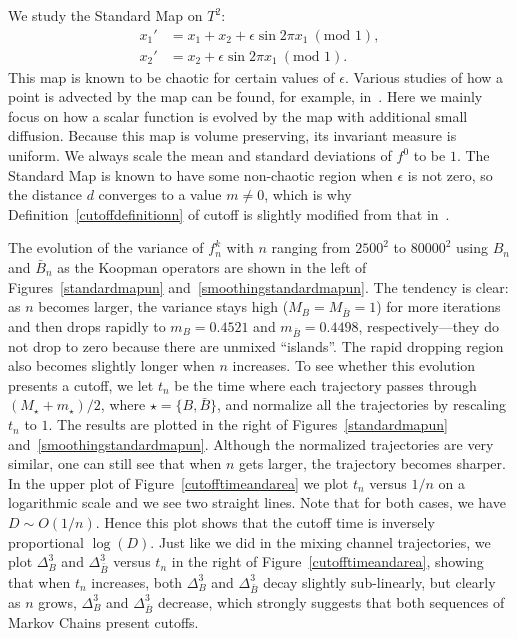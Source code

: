 \documentclass[twocolumn,10pt]{asme2e}
\begin{document}
We study the Standard Map on $T^2$:
   \begin{align}
   \label{Standardmap}
               x_1' &= x_1+x_2 +\epsilon \sin{2 \pi x_1}  \ (\mbox{mod } 1), \nonumber\\
               x_2' &=  x_2 +\epsilon \sin{2 \pi x_1}     \ (\mbox{mod } 1).
   \end{align}
This map is known to be chaotic for certain values of
$\epsilon$. Various studies of how a point is advected by the map can
be found, for example, in~\cite{Ott2002}. Here we mainly focus on how
a scalar function is evolved by the map with additional small
diffusion. Because this map is volume preserving, its invariant
measure is uniform. We always scale the mean and standard deviations
of $f^0$ to be $1$. The Standard Map is known to have some non-chaotic
region when $\epsilon$ is not zero, so the distance $d$ converges to a
value $m \neq 0$, which is why Definition~\ref{cutoffdefinitionn} of
cutoff is slightly modified from that in~\cite{Diaconis2005}.

The evolution of the variance of $f^k_n$ with $n$ ranging from
$2500^2$ to $80000^2$ using $B_n$ and $\bar{B}_n$ as the Koopman
operators are shown in the left of Figures~\ref{standardmapun}
and~\ref{smoothingstandardmapun}. The tendency is clear: as $n$
becomes larger, the variance stays high ($M_B=M_{\bar{B}}=1$) for more
iterations and then drops rapidly to $m_{B} = 0.4521$ and
$m_{\bar{B}}=0.4498$, respectively---they do not drop to zero because
there are unmixed ``islands''. The rapid dropping region also becomes
slightly longer when $n$ increases. To see whether this evolution
presents a cutoff, we let $t_n$ be the time where each trajectory
passes through $(M_{\star}+m_{\star})/2$, where $\star=\{B,\bar{B}\}$,
and normalize all the trajectories by rescaling $t_n$ to $1$. The
results are plotted in the right of Figures~\ref{standardmapun}
and~\ref{smoothingstandardmapun}. Although the normalized trajectories
are very similar, one can still see that when $n$ gets larger, the
trajectory becomes sharper. In the upper plot of
Figure~\ref{cutofftimeandarea} we plot $t_n$ versus $1/n$ on a
logarithmic scale and we see two straight lines. Note that for both
cases, we have $D\sim O(1/n)$. Hence this plot shows that the cutoff
time is inversely proportional $\log(D)$. Just like we did in the
mixing channel trajectories, we plot $\Delta^3_B$ and
$\Delta^3_{\bar{B}}$ versus $t_n$ in the right of
Figure~\ref{cutofftimeandarea}, showing that when $t_n$ increases,
both $\Delta_{B}^3$ and $\Delta_{\bar{B}}^3$ decay slightly
sub-linearly, but clearly as $n$ grows, $\Delta^3_{B}$ and
$\Delta^3_{\bar{B}}$ decrease, which strongly suggests that both
sequences of Markov Chains present cutoffs.
\end{document}
